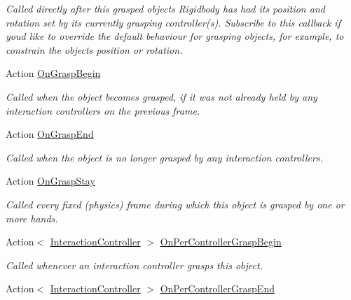 \begin{DoxyCompactItemize}
\begin{DoxyCompactList}\small\item\em Called directly after this grasped object\textquotesingle{}s Rigidbody has had its position and rotation set by its currently grasping controller(s). Subscribe to this callback if you\textquotesingle{}d like to override the default behaviour for grasping objects, for example, to constrain the object\textquotesingle{}s position or rotation. \end{DoxyCompactList}\item 
Action \mbox{\hyperlink{class_leap_1_1_unity_1_1_interaction_1_1_interaction_behaviour_a2d1393f9aa91a358e24fa6919eb09265}{On\+Grasp\+Begin}}
\begin{DoxyCompactList}\small\item\em Called when the object becomes grasped, if it was not already held by any interaction controllers on the previous frame. \end{DoxyCompactList}\item 
Action \mbox{\hyperlink{class_leap_1_1_unity_1_1_interaction_1_1_interaction_behaviour_aa28fa95514cad60b292efec67f235e35}{On\+Grasp\+End}}
\begin{DoxyCompactList}\small\item\em Called when the object is no longer grasped by any interaction controllers. \end{DoxyCompactList}\item 
Action \mbox{\hyperlink{class_leap_1_1_unity_1_1_interaction_1_1_interaction_behaviour_a244ec47dabdd267d0b7b37a599e04fc0}{On\+Grasp\+Stay}}
\begin{DoxyCompactList}\small\item\em Called every fixed (physics) frame during which this object is grasped by one or more hands. \end{DoxyCompactList}\item 
Action$<$ \mbox{\hyperlink{class_leap_1_1_unity_1_1_interaction_1_1_interaction_controller}{Interaction\+Controller}} $>$ \mbox{\hyperlink{class_leap_1_1_unity_1_1_interaction_1_1_interaction_behaviour_afb19f00ee7c35e145c70875cca188c8c}{On\+Per\+Controller\+Grasp\+Begin}}
\begin{DoxyCompactList}\small\item\em Called whenever an interaction controller grasps this object. \end{DoxyCompactList}\item 
Action$<$ \mbox{\hyperlink{class_leap_1_1_unity_1_1_interaction_1_1_interaction_controller}{Interaction\+Controller}} $>$ \mbox{\hyperlink{class_leap_1_1_unity_1_1_interaction_1_1_interaction_behaviour_a7517ff556c13b62dffe882003346b9f1}{On\+Per\+Controller\+Grasp\+End}}

\end{DoxyCompactItemize}
